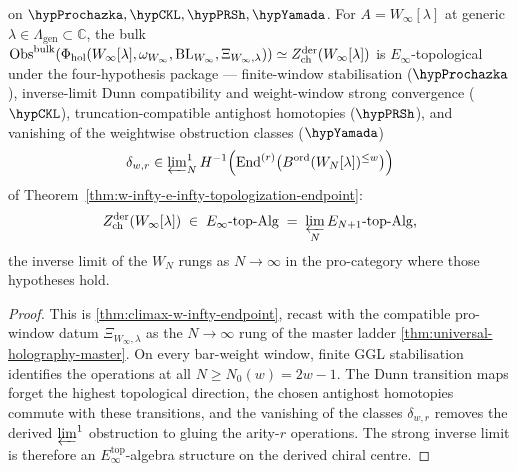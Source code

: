 \begin{corollary}
\ClaimStatusConditional{} on $\hypProchazka, \hypCKL, \hypPRSh, \hypYamada$.
For $A = W_{\infty}[\lambda]$ at generic
$\lambda \in \Lambda_{\mathrm{gen}} \subset \mathbb{C}$, the bulk
$\mathrm{Obs}^{\mathrm{bulk}}(\Phi_{\mathrm{hol}}(W_{\infty}[\lambda],
\omega_{W_\infty},\mathrm{BL}_{W_\infty},\Xi_{W_\infty,\lambda}))
\simeq Z^{\mathrm{der}}_{\mathrm{ch}}(W_{\infty}[\lambda])$ is
$E_{\infty}$-topological under the four-hypothesis package — finite-window
stabilisation ($\hypProchazka$), inverse-limit Dunn compatibility
and weight-window strong convergence ($\hypCKL$),
truncation-compatible antighost homotopies ($\hypPRSh$), and vanishing
of the weightwise obstruction classes ($\hypYamada$)
\[
 \delta_{w,r}\in
 \varprojlim\nolimits_N^{1}
 H^{-1}\!\left(\operatorname{End}^{(r)}
 \bigl(B^{\mathrm{ord}}(W_N[\lambda])^{\le w}\bigr)\right)
\]
of Theorem~\ref{thm:w-infty-e-infty-topologization-endpoint}:
\[
 Z^{\mathrm{der}}_{\mathrm{ch}}(W_{\infty}[\lambda])
 \;\in\; E_{\infty}\text{-}\mathrm{top}\text{-}\mathrm{Alg}
 \;=\; \varprojlim_{N} E_{N+1}\text{-}\mathrm{top}\text{-}\mathrm{Alg},
\]
the inverse limit of the $W_{N}$ rungs as $N \to \infty$ in the
pro-category where those hypotheses hold.
\end{corollary}

\begin{proof}
This is \cref{thm:climax-w-infty-endpoint}, recast with the
compatible pro-window datum \(\Xi_{W_\infty,\lambda}\) as the
$N \to \infty$ rung of the master ladder
\cref{thm:universal-holography-master}. On every bar-weight window,
finite GGL stabilisation identifies the operations at all
$N\ge N_0(w)=2w-1$. The Dunn transition maps forget the highest
topological direction, the chosen antighost homotopies commute with
these transitions, and the vanishing of the classes $\delta_{w,r}$
removes the derived $\varprojlim^1$ obstruction to gluing the
arity-$r$ operations. The strong inverse limit is therefore an
$E_{\infty}^{\mathrm{top}}$-algebra structure on the derived chiral
centre.
\end{proof}

